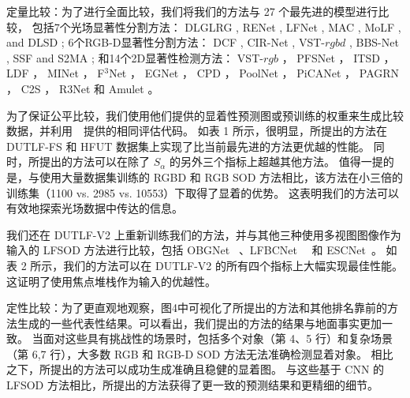 定量比较：为了进行全面比较，我们将我们的方法与 27 个最先进的模型进行比较，
包括7个光场显著性分割方法：
DLGLRG \cite{liu2021light}, RENet \cite{piao2020exploit}, LFNet \cite{zhang2020lfnet},
MAC \cite{zhang2020light}, MoLF \cite{zhang2019memory}, and DLSD \cite{piao2019deep};
%
%
%
%
6个RGB-D显著性分割方法：
DCF \cite{ji2021calibrated}, CIR-Net \cite{cong2022cir}, VST-$rgbd$  \cite{liu2021visual},
BBS-Net     \cite{fan2020bbs}, SSF     \cite{zhang2020select} and S2MA    \cite{liu2020learning};
%
%
%
%
%
和14个2D显著性检测方法：
VST-$rgb$ \cite{liu2021visual}，
PFSNet \cite{ma2021pyramidal}，
ITSD \cite{zhou2020interactive}，
LDF \cite{wei2020label}，
MINet \cite{pang2020multi}，
F$^{3}$Net  \cite{wei2020f3net}， 
EGNet   \cite{zhao2019egnet}，
CPD  \cite{wu2019cascaded}，
PoolNet \cite{liu2019simple}，
PiCANet \cite{liu2018picanet}，
PAGRN \cite{wang2018detect}，
C2S   \cite{li2018contour}，
R3Net  \cite{deng2018r3net}
和
Amulet \cite{zhang2017amulet}
。
%
%
%
%
%
\par
%
%
为了保证公平比较，我们使用他们提供的显着性预测图或预训练的权重来生成比较数据，并利用~\cite{liu2021visual}~提供的相同评估代码。 如表 1 所示，很明显，所提出的方法在 DUTLF-FS 和 HFUT 数据集上实现了比当前最先进的方法更优越的性能。 同时，所提出的方法可以在除了 $ S_{\alpha} $ 的另外三个指标上超越其他方法。 值得一提的是，与使用大量数据集训练的 RGBD 和 RGB SOD 方法相比，该方法在小三倍的训练集（1100 vs. 2985 vs. 10553）下取得了显着的优势。 这表明我们的方法可以有效地探索光场数据中传达的信息。 
%
%
%
%
\par
%
%
%
我们还在 DUTLF-V2 上重新训练我们的方法，并与其他三种使用多视图图像作为输入的 LFSOD 方法进行比较，包括 OBGNet ~\cite{jing2021occlusion}、LFBCNet~\cite{wang2022lfbcnet}~ 和 ESCNet~\cite{zhang2022exploring}。 如表 2 所示，我们的方法可以在 DUTLF-V2 的所有四个指标上大幅实现最佳性能。 这证明了使用焦点堆栈作为输入的优越性。 
%
%
%
%
%
\par
%
%
定性比较：为了更直观地观察，图4中可视化了所提出的方法和其他排名靠前的方法生成的一些代表性结果。可以看出，我们提出的方法的结果与地面事实更加一致。 当面对这些具有挑战性的场景时，包括多个对象（第 4、5 行）和复杂场景（第 6,7 行），大多数 RGB 和 RGB-D SOD 方法无法准确检测显着对象。 相比之下，所提出的方法可以成功生成准确且稳健的显着图。 与这些基于 CNN 的 LFSOD 方法相比，所提出的方法获得了更一致的预测结果和更精细的细节。

